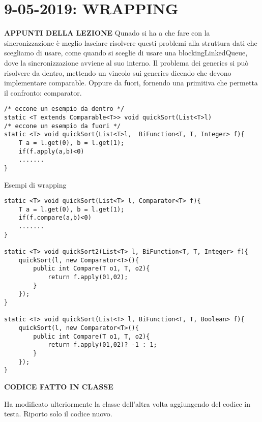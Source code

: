 

\newpage
\section{9-05-2019: WRAPPING}
\noindent \textbf{APPUNTI DELLA LEZIONE} \newline
Qunado si ha a che fare con la sincronizzazione è meglio lasciare risolvere questi problemi alla struttura dati che scegliamo di usare, come quando si sceglie di usare una blockingLinkedQueue, dove la sincronizzazione avviene al suo interno. \newline
Il problema dei generics si può risolvere da dentro, mettendo un vincolo sui generics dicendo che devono implementare comparable. Oppure da fuori, fornendo una primitiva che permetta il confronto: comparator. \newline
\begin{lstlisting}
/* eccone un esempio da dentro */
static <T extends Comparable<T>> void quickSort(List<T>l)
/* eccone un esempio da fuori */
static <T> void quickSort(List<T>l,  BiFunction<T, T, Integer> f){
	T a = l.get(0), b = l.get(1);
	if(f.apply(a,b)<0)
	.......
}
\end{lstlisting}

\noindent Esempi di wrapping
\begin{lstlisting}
static <T> void quickSort(List<T> l, Comparator<T> f){
	T a = l.get(0), b = l.get(1);
	if(f.compare(a,b)<0)
	.......
}

static <T> void quickSort2(List<T> l, BiFunction<T, T, Integer> f){
	quickSort(l, new Comparator<T>(){
		public int Compare(T o1, T, o2){
			return f.apply(01,02);
		}
	});
}

static <T> void quickSort(List<T> l, BiFunction<T, T, Boolean> f){
	quickSort(l, new Comparator<T>(){
		public int Compare(T o1, T, o2){
			return f.apply(01,02)? -1 : 1;
		}
	});
}

\end{lstlisting}
\noindent \textbf{CODICE FATTO IN CLASSE} \newline

\noindent Ha modificato ulteriormente la classe dell'altra volta aggiungendo del codice in testa. Riporto solo il codice nuovo.
 
